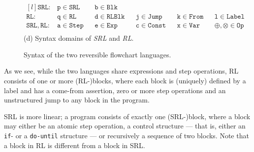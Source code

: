 \begin{figure}[h]
  \begin{minipage}{\textwidth}
    \center
    $$\begin{matrix*}[l]
      \mathtt{SRL}:     & \mathtt{p}\in\mathtt{SRL}  & & \mathtt{b}\in\mathtt{Blk}\\
      \mathtt{RL}:      & \mathtt{q}\in\mathtt{RL}   & & \mathtt{d}\in\mathtt{RLBlk} & & \mathtt{j}\in\mathtt{Jump}  & & \mathtt{k}\in\mathtt{From} & & \mathtt{l}\in\mathtt{Label}\\
      \mathtt{SRL, RL}: & \mathtt{a}\in\mathtt{Step} & & \mathtt{e}\in\mathtt{Exp}   & & \mathtt{c}\in\mathtt{Const} & & \mathtt{x}\in\mathtt{Var}  & & \oplus,\otimes\in\mathtt{Op}\\
    \end{matrix*}$$
    (d) Syntax domains of \textit{SRL} and \textit{RL}.
  \end{minipage}

  \caption{Syntax of the two reversible flowchart languages.}
  \label{fig:rl_srl_grammar_and_structure}

\end{figure}

\noindent As we see, while the two languages share expressions and step operations, RL consists of one or more (RL-)blocks, where each block is (uniquely) defined by a label and has a come-from assertion, zero or more step operations and an unstructured jump to any block in the program.

SRL is more linear; a program consists of exactly one (SRL-)block, where a block may either be an atomic step operation, a control structure --- that is, either an \texttt{if}- or a \texttt{do-until} structure --- or recursively a sequence of two blocks. Note that a block in RL is different from a block in SRL.\

